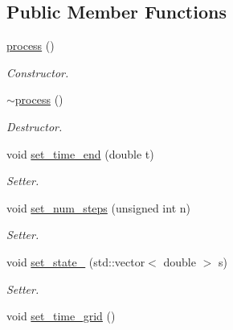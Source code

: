 \subsection*{Public Member Functions}
\begin{DoxyCompactItemize}
\item 
\hyperlink{classprocess_a59faea64773f0619162d80135c334c80}{process} ()\hypertarget{classprocess_a59faea64773f0619162d80135c334c80}{}\label{classprocess_a59faea64773f0619162d80135c334c80}

\begin{DoxyCompactList}\small\item\em Constructor. \end{DoxyCompactList}\item 
\hyperlink{classprocess_af5f38b7ec02665033d47936fec5c498d}{$\sim$process} ()\hypertarget{classprocess_af5f38b7ec02665033d47936fec5c498d}{}\label{classprocess_af5f38b7ec02665033d47936fec5c498d}

\begin{DoxyCompactList}\small\item\em Destructor. \end{DoxyCompactList}\item 
void \hyperlink{classprocess_aaf36acd58fc1d875a6b1ad9e3000c9f9}{set\+\_\+time\+\_\+end} (double t)\hypertarget{classprocess_aaf36acd58fc1d875a6b1ad9e3000c9f9}{}\label{classprocess_aaf36acd58fc1d875a6b1ad9e3000c9f9}

\begin{DoxyCompactList}\small\item\em Setter. \end{DoxyCompactList}\item 
void \hyperlink{classprocess_a479e9c720b3fb9a9e900a1dc6e85b7b8}{set\+\_\+num\+\_\+steps} (unsigned int n)\hypertarget{classprocess_a479e9c720b3fb9a9e900a1dc6e85b7b8}{}\label{classprocess_a479e9c720b3fb9a9e900a1dc6e85b7b8}

\begin{DoxyCompactList}\small\item\em Setter. \end{DoxyCompactList}\item 
void \hyperlink{classprocess_a1c1550dc3afc293860934496a3239a62}{set\+\_\+state\+\_} (std\+::vector$<$ double $>$ s)\hypertarget{classprocess_a1c1550dc3afc293860934496a3239a62}{}\label{classprocess_a1c1550dc3afc293860934496a3239a62}

\begin{DoxyCompactList}\small\item\em Setter. \end{DoxyCompactList}\item 
void \hyperlink{classprocess_af548473ced7827cf2f100a2c74cdaf76}{set\+\_\+time\+\_\+grid} ()\hypertarget{classprocess_af548473ced7827cf2f100a2c74cdaf76}{}\label{classprocess_af548473ced7827cf2f100a2c74cdaf76}


\end{DoxyCompactItemize}
